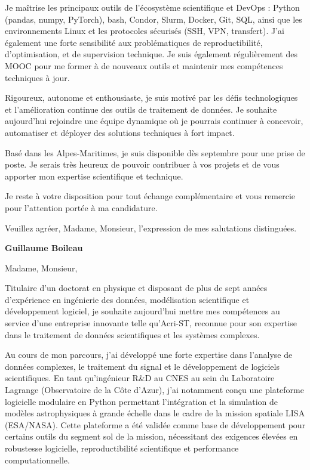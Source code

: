 \documentclass[10pt,a4paper]{../_shared/altacv}
\begin{document}
{Je maîtrise les principaux outils de l'écosystème scientifique et DevOps : Python (pandas, numpy, PyTorch), bash, Condor, Slurm, Docker, Git, SQL, ainsi que les environnements Linux et les protocoles sécurisés (SSH, VPN, transfert). J'ai également une forte sensibilité aux problématiques de reproductibilité, d'optimisation, et de supervision technique. Je suis également régulièrement des MOOC pour me former à de nouveaux outils et maintenir mes compétences techniques à jour.

Rigoureux, autonome et enthousiaste, je suis motivé par les défis technologiques et l'amélioration continue des outils de traitement de données. Je souhaite aujourd'hui rejoindre une équipe dynamique où je pourrais continuer à concevoir, automatiser et déployer des solutions techniques à fort impact.

Basé dans les Alpes-Maritimes, je suis disponible dès septembre pour une prise de poste. Je serais très heureux de pouvoir contribuer à vos projets et de vous apporter mon expertise scientifique et technique.

Je reste à votre disposition pour tout échange complémentaire et vous remercie pour l'attention portée à ma candidature.

Veuillez agréer, Madame, Monsieur, l'expression de mes salutations distinguées.

\textbf{Guillaume Boileau}



}

Madame, Monsieur,

Titulaire d’un doctorat en physique et disposant de plus de sept années d’expérience en ingénierie des données, modélisation scientifique et développement logiciel, je souhaite aujourd’hui mettre mes compétences au service d’une entreprise innovante telle qu’Acri-ST, reconnue pour son expertise dans le traitement de données scientifiques et les systèmes complexes.

Au cours de mon parcours, j’ai développé une forte expertise dans l’analyse de données complexes, le traitement du signal et le développement de logiciels scientifiques. En tant qu’ingénieur R\&D au CNES au sein du Laboratoire Lagrange (Observatoire de la Côte d’Azur), j’ai notamment conçu une plateforme logicielle modulaire en Python permettant l’intégration et la simulation de modèles astrophysiques à grande échelle dans le cadre de la mission spatiale LISA (ESA/NASA). Cette plateforme a été validée comme base de développement pour certains outils du segment sol de la mission, nécessitant des exigences élevées en robustesse logicielle, reproductibilité scientifique et performance computationnelle.
\end{document}
